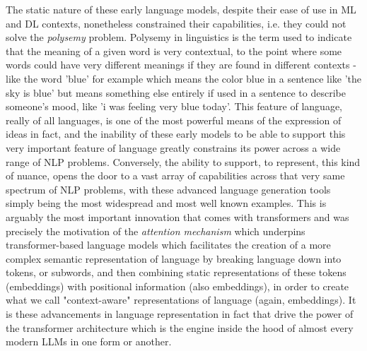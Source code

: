 \documentclass[final]{clv2025-revised}
\begin{document}
The static nature of these early language models, despite their ease of use in ML and DL contexts, nonetheless constrained their capabilities, i.e. they could not solve the \textit{polysemy} problem. Polysemy in linguistics is the term used to indicate that the meaning of a given word is very contextual, to the point where some words could have very different meanings if they are found in different contexts - like the word 'blue' for example which means the color blue in a sentence like 'the sky is blue' but means something else entirely if used in a sentence to describe someone's mood, like 'i was feeling very blue today'. This feature of language, really of all languages, is one of the most powerful means of the expression of ideas in fact, and the inability of these early models to be able to support this very important feature of language greatly constrains its power across a wide range of NLP problems. Conversely, the ability to support, to represent, this kind of nuance, opens the door to a vast array of capabilities across that very same spectrum of NLP problems, with these advanced language generation tools simply being the most widespread and most well known examples. This is arguably the most important innovation that comes with transformers and was precisely the motivation of the \textit{attention mechanism} \cite{bahdanau2016neuralmachinetranslationjointly} \cite{vaswani} which underpins transformer-based language models which facilitates the creation of a more complex semantic representation of language by breaking language down into tokens, or subwords, and then combining static representations of these tokens (embeddings) with positional information (also embeddings), in order to create what we call "context-aware" representations of language (again, embeddings). It is these advancements in language representation in fact that drive the power of the transformer architecture \cite{vaswani} which is the engine inside the hood of almost every modern LLMs in one form or another. 
\end{document}
